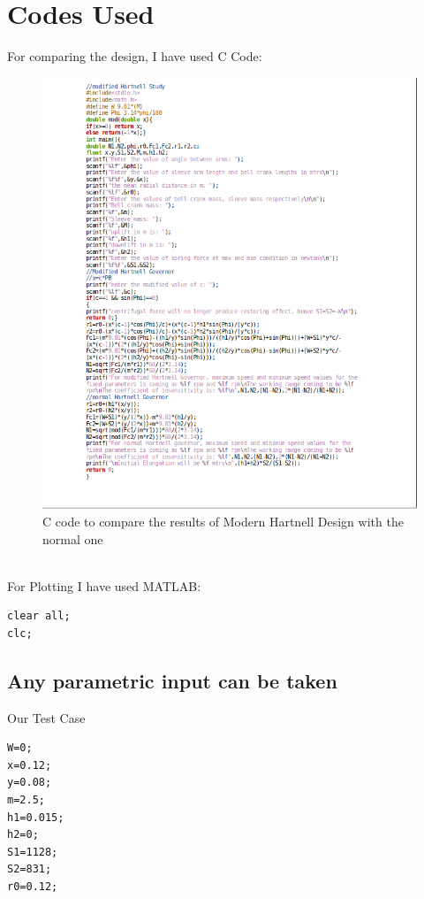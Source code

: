 \documentclass[15pt,a4paper,oneside]{article}
\begin{document}
\section{Codes Used}
For comparing the design, I have used C Code:\\
\begin{figure}[p]
	\centerline{\includegraphics[scale=0.9]{pasted11.png}}
	\caption{C code to compare the results of Modern Hartnell Design with the normal one}
	\label{fig}
\end{figure}\\[10cm]
For Plotting I have used MATLAB:
\begin{verbatim}
clear all;
clc;
\end{verbatim}


\subsection*{Any parametric input can be taken}

\begin{par}
Our Test Case
\end{par} \vspace{1em}
\begin{verbatim}
W=0;
x=0.12;
y=0.08;
m=2.5;
h1=0.015;
h2=0;
S1=1128;
S2=831;
r0=0.12;
\end{verbatim}
\end{document}
